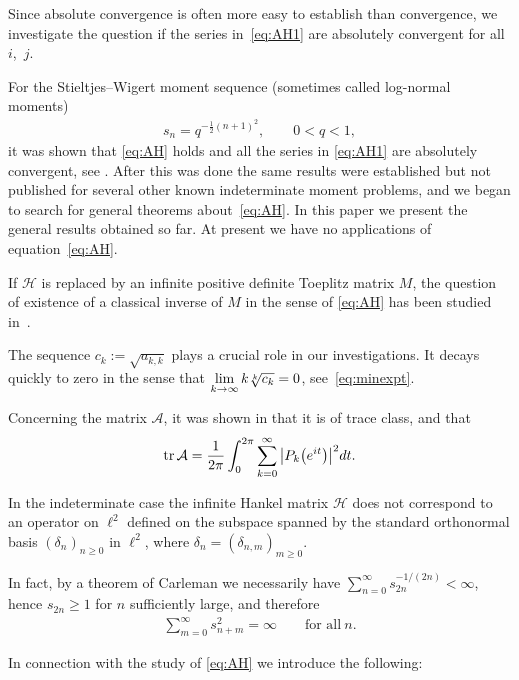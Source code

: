 \documentclass[11pt]{article}
\DeclareMathOperator{\tr}{tr}
\numberwithin{equation}{section}
\begin{document}
Since absolute convergence is often more easy to establish than convergence, we investigate the question if the series in~\eqref{eq:AH1} are absolutely convergent for all~$i$,~$j$.

For the Stieltjes--Wigert moment sequence (sometimes called log-normal moments)
\begin{gather*}
s_n=q^{-\tfrac12 (n+1)^2},\qquad 0<q<1,
\end{gather*}
 it was shown that \eqref{eq:AH} holds and all the series in \eqref{eq:AH1} are absolutely convergent, see \cite[Section~5]{B:S1}. After this was done the same results were established but not published for several other known indeterminate moment problems, and we began to search for general theorems about~\eqref{eq:AH}. In this paper we present the general results obtained so far. At present we have no applications of equation~\eqref{eq:AH}.

If $\mathcal H$ is replaced by an infinite positive definite Toeplitz matrix $M$, the question of existence of a classical inverse of $M$ in the sense of \eqref{eq:AH} has been studied in~\cite{E:G:T}.

The sequence $c_k:=\sqrt{a_{k,k}}$ plays a crucial role in our investigations. It decays quickly to zero in the sense that $\lim\limits_{k\to\infty} k\root{k}\of{c_{k}}=0$, see~\eqref{eq:minexpt}.

Concerning the matrix $\mathcal A$, it was shown in \cite[Section~4]{B:S1} that it is of trace class, and that
\begin{gather*}
\tr\mathcal A=\frac{1}{2\pi}\int_0^{2\pi} \sum_{k=0}^\infty \big|P_k\big({\rm e}^{{\rm i}t}\big)\big|^2{\rm d}t.
\end{gather*}

In the indeterminate case the infinite Hankel matrix $\mathcal H$ does not correspond to an operator on $\ell^2$ defined on the subspace spanned by the standard orthonormal basis $(\delta_n)_{n\ge 0}$ in $\ell^2$, where $\delta_n=(\delta_{n,m})_{m\ge 0}$.

In fact, by a theorem of Carleman we necessarily have $\sum\limits_{n=0}^\infty s_{2n}^{-1/(2n)}<\infty$, hence $s_{2n}\ge 1$ for $n$ sufficiently large, and therefore
\begin{gather*}
\sum_{m=0}^\infty s_{n+m}^2=\infty\qquad \mbox{for all} \ n.
\end{gather*}

In connection with the study of \eqref{eq:AH} we introduce the following:
\end{document}
